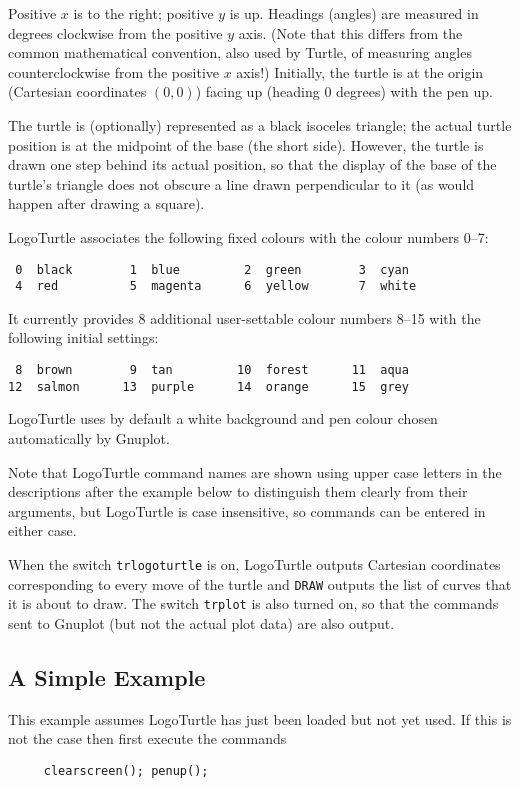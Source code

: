 Positive $x$ is to the right; positive $y$ is up.  Headings (angles)
are measured in degrees clockwise from the positive $y$ axis.  (Note
that this differs from the common mathematical convention, also used
by Turtle, of measuring angles counterclockwise from the positive $x$
axis!)  Initially, the turtle is at the origin (Cartesian coordinates
$(0,0)$) facing up (heading 0 degrees) with the pen up.

The turtle is (optionally) represented as a black isoceles triangle;
the actual turtle position is at the midpoint of the base (the short
side).  However, the turtle is drawn one step behind its actual
position, so that the display of the base of the turtle's triangle
does not obscure a line drawn perpendicular to it (as would happen
after drawing a square).

LogoTurtle associates the following fixed colours with the colour
numbers 0--7:
\begin{verbatim}
 0  black        1  blue         2  green        3  cyan
 4  red          5  magenta      6  yellow       7  white
\end{verbatim}
It currently provides 8 additional user-settable colour numbers 8--15
with the following initial settings:
\begin{verbatim}
 8  brown        9  tan         10  forest      11  aqua
12  salmon      13  purple      14  orange      15  grey
\end{verbatim}
LogoTurtle uses by default a white background and pen colour chosen
automatically by Gnuplot.

Note that LogoTurtle command names are shown using upper case letters
in the descriptions after the example below to distinguish them
clearly from their arguments, but LogoTurtle is case insensitive, so
commands can be entered in either case.

When the switch \texttt{trlogoturtle} is on, LogoTurtle outputs
Cartesian coordinates corresponding to every move of the turtle and
\texttt{DRAW} outputs the list of curves that it is about to draw.
The switch \texttt{trplot} is also turned on, so that the commands
sent to Gnuplot (but not the actual plot data) are also output.


\subsection{A Simple Example}

This example assumes LogoTurtle has just been loaded but not yet used.
If this is not the case then first execute the commands
\begin{verbatim}
     clearscreen(); penup();
\end{verbatim}

